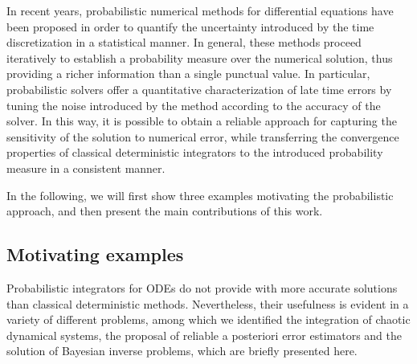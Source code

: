 \documentclass[final,onefignum,onetabnum]{siamonline171218}
\begin{document}
In recent years, probabilistic numerical methods for differential equations have been proposed \cite{CGS16, CCC16, KeH16} in order to quantify the uncertainty introduced by the time discretization in a statistical manner. In general, these methods proceed iteratively to establish a probability measure over the numerical solution, thus providing a richer information than a single punctual value. In particular, probabilistic solvers offer a quantitative characterization of late time errors by tuning the noise introduced by the method according to the accuracy of the solver. In this way, it is possible to obtain a reliable approach for capturing the sensitivity of the solution to numerical error, while transferring the convergence properties of classical deterministic integrators to the introduced probability measure in a consistent manner. 

In the following, we will first show three examples motivating the probabilistic approach, and then present the main contributions of this work.

\subsection{Motivating examples} Probabilistic integrators for ODEs do not provide with more accurate solutions than classical deterministic methods. Nevertheless, their usefulness is evident in a variety of different problems, among which we identified the integration of chaotic dynamical systems, the proposal of reliable a posteriori error estimators and the solution of Bayesian inverse problems, which are briefly presented here.
\end{document}
